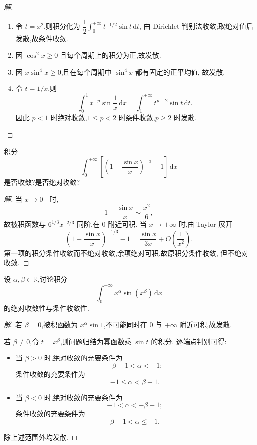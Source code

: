 \documentclass[../../数学分析培优讲义(答案版).tex]{subfiles}
\begin{document}
\begin{proof}[解]
\begin{enumerate}[label=(\arabic*)]
    \item 令 $t=x^2$,则积分化为
    $\dfrac{1}{2}\displaystyle\int_0^{+\infty}t^{-1/2}\sin t\,\mathrm{d}t$,
    由 Dirichlet 判别法收敛;取绝对值后发散,故条件收敛.
    \item 因 $\cos^2x\geq0$ 且每个周期上的积分为正,故发散.
    \item 因 $x\sin^4x\geq0$,且在每个周期中 $\sin^4x$ 都有固定的正平均值,
    故发散.
    \item 令 $t=1/x$,则
    \[
        \int_0^1x^{-p}\sin\dfrac{1}{x}\,\mathrm{d}x
        =\int_1^{+\infty}t^{p-2}\sin t\,\mathrm{d}t.
    \]
    因此 $p<1$ 时绝对收敛,$1\leq p<2$ 时条件收敛,$p\geq2$ 时发散.
\end{enumerate}
\end{proof}

\begin{example}
积分
\[
    \int_0^{+\infty}\left[\left(1-\dfrac{\sin x}{x}\right)^{-\frac{1}{3}}-1\right]\,\mathrm{d}x
\]
是否收敛?是否绝对收敛?
\end{example}

\begin{proof}[解]
当 $x\to0^+$ 时,
\[
    1-\dfrac{\sin x}{x}\sim\dfrac{x^2}{6},
\]
故被积函数与 $6^{1/3}x^{-2/3}$ 同阶,在 $0$ 附近可积.
当 $x\to+\infty$ 时,由 Taylor 展开
\[
    \left(1-\dfrac{\sin x}{x}\right)^{-1/3}-1
    =\dfrac{\sin x}{3x}+O\left(\dfrac{1}{x^2}\right).
\]
第一项的积分条件收敛而不绝对收敛,余项绝对可积.故原积分条件收敛,
但不绝对收敛.
\end{proof}

\begin{example}
设 $\alpha,\beta\in\mathbb{R}$,讨论积分
\[
    \int_0^{+\infty}x^\alpha\sin(x^\beta)\,\mathrm{d}x
\]
的绝对收敛性与条件收敛性.
\end{example}

\begin{proof}[解]
若 $\beta=0$,被积函数为 $x^\alpha\sin1$,不可能同时在 $0$ 与
$+\infty$ 附近可积,故发散.

若 $\beta\neq0$,令 $t=x^\beta$,则问题归结为幂函数乘 $\sin t$ 的积分.
逐端点判别可得:
\begin{itemize}
    \item 当 $\beta>0$ 时,绝对收敛的充要条件为
    \[
        -\beta-1<\alpha<-1;
    \]
    条件收敛的充要条件为
    \[
        -1\leq\alpha<\beta-1.
    \]
    \item 当 $\beta<0$ 时,绝对收敛的充要条件为
    \[
        -1<\alpha<-\beta-1;
    \]
    条件收敛的充要条件为
    \[
        \beta-1<\alpha\leq-1.
    \]
\end{itemize}
除上述范围外均发散.
\end{proof}
\end{document}
